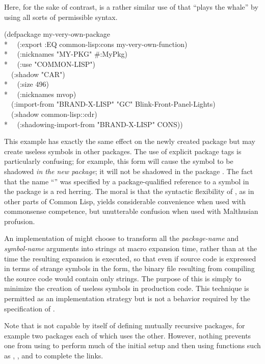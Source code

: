 \begin{defmac}
Here, for the sake of contrast, is a rather similar use of
 that ``plays the whale'' by using all sorts of
permissible syntax.
\begin{lisp}
(defpackage my-very-own-package \\*
~~(:export :EQ common-lisp:cons my-very-own-function) \\*
~~(:nicknames "MY-PKG" \#:MyPkg) \\*
~~(:use "COMMON-LISP") \\
~~(:shadow "CAR") \\*
~~(:size 496) \\*
~~(:nicknames mvop) \\
~~(:import-from "BRAND-X-LISP" "GC" Blink-Front-Panel-Lights) \\
~~(:shadow common-lisp::cdr) \\*
~~(:shadowing-import-from "BRAND-X-LISP" CONS))
\end{lisp}
This example has exactly the same effect on the newly created package
but may create useless symbols in other packages.
The use of explicit package tags is particularly confusing;
for example, this  form will cause the symbol
 to be shadowed \emph{in the new package}; it will not be
shadowed in the package .  The fact that the name ``''
was specified by a package-qualified reference to a symbol in the
 package is a red herring.
The moral is that the syntactic flexibility of ,
as in other parts of Common Lisp,
yields considerable convenience when used with commonsense competence,
but unutterable confusion when used with Malthusian profusion.

\beforenoterule
\begin{implementation}
An implementation of  might choose to transform
all the \emph{package-name} and \emph{symbol-name} arguments
into strings at macro expansion time, rather than at the time
the resulting expansion is executed, so that even if source code
is expressed in terms of strange symbols in the  form,
the binary file resulting from compiling the source code would
contain only strings.  The purpose of this is simply to minimize
the creation of useless symbols in production code.  This technique
is permitted as an implementation strategy but is not a
behavior required by the specification of .
\end{implementation}
\afternoterule

Note that  is not capable by itself of defining
mutually recursive packages, for example two packages each of
which uses the other.  However, nothing prevents one from using
 to perform much of the initial setup and then
using functions such as , , and 
to complete the links.


\end{defmac}
